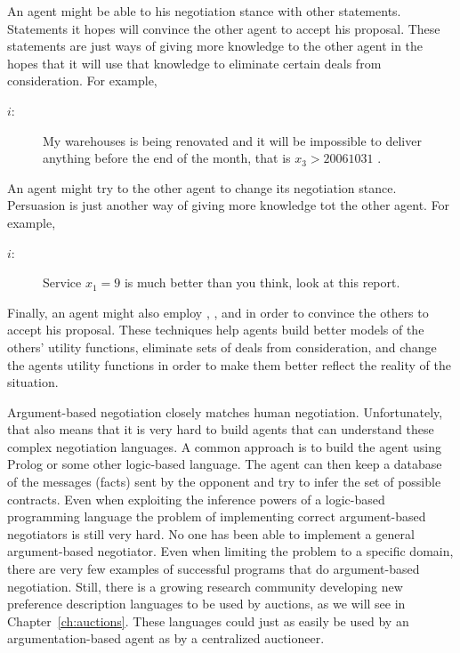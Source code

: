 An agent might be able to  his negotiation stance with
other statements. Statements it hopes will convince the other agent to
accept his proposal. These statements are just ways of giving more
knowledge to the other agent in the hopes that it will use that
knowledge to eliminate certain deals from consideration. For example,

\begin{description}
\item [$i$:] My warehouses is being renovated and it will be
  impossible to deliver anything before the end of the month, that is
  $x_3 > 20061031$ .
\end{description}

An agent might try to  the other agent to change its
negotiation stance. Persuasion is just another way of giving more
knowledge tot the other agent. For example,
\begin{description}
\item[$i$:] Service $x_1 = 9$ is much better than you think, look at
  this report.
\end{description}

Finally, an agent might also employ , , and
 in order to convince the others to accept his proposal.
These techniques help agents build better models of the others'
utility functions, eliminate sets of deals from consideration, and
change the agents utility functions in order to make them better
reflect the reality of the situation.

Argument-based negotiation closely matches human negotiation.
Unfortunately, that also means that it is very hard to build agents
that can understand these complex negotiation languages. A common
approach is to build the agent using Prolog or some other logic-based
language. The agent can then keep a database of the messages (facts)
sent by the opponent and try to infer the set of possible contracts.
Even when exploiting the inference powers of a logic-based programming
language the problem of implementing correct argument-based
negotiators is still very hard. No one has been able to implement a
general argument-based negotiator. Even when limiting the problem to a
specific domain, there are very few examples of successful programs
that do argument-based negotiation. Still, there is a growing research
community developing new preference description languages to be used
by auctions, as we will see in Chapter~\ref{ch:auctions}. These
languages could just as easily be used by an argumentation-based agent
as by a centralized auctioneer. 


